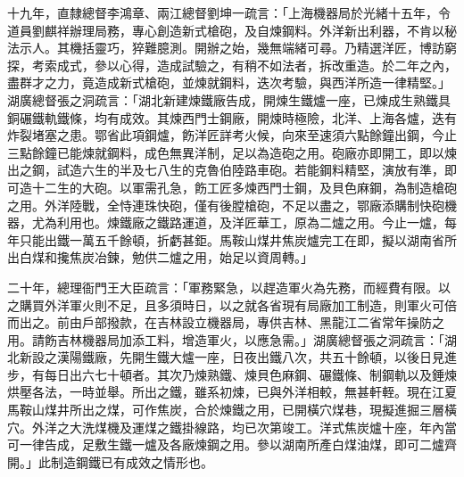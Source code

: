 \begin{pinyinscope}
十九年，直隸總督李鴻章、兩江總督劉坤一疏言：「上海機器局於光緒十五年，令道員劉麒祥辦理局務，專心創造新式槍砲，及自煉鋼料。外洋新出利器，不肯以秘法示人。其機括靈巧，猝難臆測。開辦之始，幾無端緒可尋。乃精選洋匠，博訪窮探，考索成式，參以心得，造成試驗之，有稍不如法者，拆改重造。於二年之內，盡群才之力，竟造成新式槍砲，並煉就鋼料，迭次考驗，與西洋所造一律精堅。」湖廣總督張之洞疏言：「湖北新建煉鐵廠告成，開煉生鐵爐一座，已煉成生熟鐵具銅碾鐵軌鐵條，均有成效。其煉西門士鋼廠，開煉時極險，北洋、上海各爐，迭有炸裂堵塞之患。鄂省此項鋼爐，飭洋匠詳考火候，向來至速須六點餘鐘出鋼，今止三點餘鐘已能煉就鋼料，成色無異洋制，足以為造砲之用。砲廠亦即開工，即以煉出之鋼，試造六生的半及七八生的克魯伯陸路車砲。若能鋼料精堅，演放有準，即可造十二生的大砲。以軍需孔急，飭工匠多煉西門士鋼，及貝色麻鋼，為制造槍砲之用。外洋陸戰，全恃連珠快砲，僅有後膛槍砲，不足以盡之，鄂廠添購制快砲機器，尤為利用也。煉鐵廠之鐵路運道，及洋匠華工，原為二爐之用。今止一爐，每年只能出鐵一萬五千餘頓，折虧甚鉅。馬鞍山煤井焦炭爐完工在即，擬以湖南省所出白煤和攙焦炭冶鍊，勉供二爐之用，始足以資周轉。」

二十年，總理衙門王大臣疏言：「軍務緊急，以趕造軍火為先務，而經費有限。以之購買外洋軍火則不足，且多須時日，以之就各省現有局廠加工制造，則軍火可倍而出之。前由戶部撥款，在吉林設立機器局，專供吉林、黑龍江二省常年操防之用。請飭吉林機器局加添工料，增造軍火，以應急需。」湖廣總督張之洞疏言：「湖北新設之漢陽鐵廠，先開生鐵大爐一座，日夜出鐵八次，共五十餘頓，以後日見進步，有每日出六七十頓者。其次乃煉熟鐵、煉貝色麻鋼、碾鐵條、制鋼軌以及錘煉烘壓各法，一時並舉。所出之鐵，雖系初煉，已與外洋相較，無甚軒輊。現在江夏馬鞍山煤井所出之煤，可作焦炭，合於煉鐵之用，已開橫穴煤巷，現擬進掘三層橫穴。外洋之大洗煤機及運煤之鐵掛線路，均已次第竣工。洋式焦炭爐十座，年內當可一律告成，足敷生鐵一爐及各廠煉鋼之用。參以湖南所產白煤油煤，即可二爐齊開。」此制造鋼鐵已有成效之情形也。


\end{pinyinscope}
